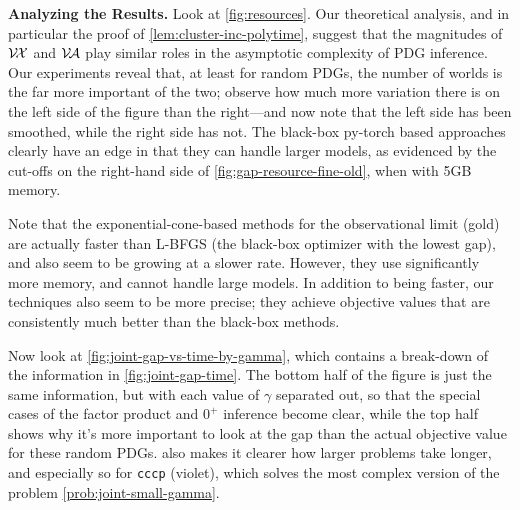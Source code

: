 \begin{subappendices}
\textbf{Analyzing the Results.}
Look at  \cref{fig:resources}.  Our theoretical analysis, and in particular the proof of \cref{lem:cluster-inc-polytime}, suggest that the magnitudes of $\mathcal V\!\mathcal X$ and $\mathcal V\!\mathcal A$ play similar roles in the asymptotic complexity of PDG inference.
Our experiments reveal that, at least for random PDGs, the number of worlds is the far more important of the two; observe how much more variation there is on the left side of the figure than the right---and now note that the left side has been smoothed, while the right side has not.
The black-box py-torch based approaches clearly have an edge in that they can handle larger models, as evidenced by the cut-offs on the right-hand side of \cref{fig:gap-resource-fine-old}, when with 5GB memory.

Note that the exponential-cone-based methods for the observational limit (gold) are actually faster than L-BFGS (the black-box optimizer with the lowest gap), and also seem to be growing at a slower rate.
However, they use significantly more memory, and cannot handle large models.
In addition to being faster, our techniques also seem to be more precise; they achieve objective values that are consistently much better than the black-box methods.


Now look at \cref{fig:joint-gap-vs-time-by-gamma},
which contains a break-down of the information in \cref{fig:joint-gap-time}. The bottom half of the figure is just the same information, but with each value of $\gamma$ separated out, so that the special cases of the factor product and $0^+$ inference become clear, while the top half shows why it's more important to look at the gap than the actual objective value for these random PDGs.
 also makes it clearer how larger problems take longer, and especially so for \texttt{cccp} (violet), which solves the most complex version of the problem \eqref{prob:joint-small-gamma}.


\end{subappendices}
